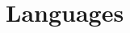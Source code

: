 \documentclass[11pt,a4paper,sans]{moderncv} %
\renewcommand*{\cventry}[7][.25em]{%
  \cvitem[#1]{#2}{%
    {\bfseries#3}%
   	\if\relax\detokenize{#4}\relax{}\else{, {\slshape#4}}\fi%
    \if\relax\detokenize{#5}\relax{}\else{ #5}\fi%
    \if\relax\detokenize{#6}\relax{}\else{ #6}\fi%
    \strut%
    \ifx&#7&%
      \else{\newline{}\begin{minipage}[t]{\linewidth}\small#7\end{minipage}}\fi}}
\renewcommand{\linkedin}{Linked\tikz[baseline=(i.text)]\node[fill=blue,rounded corners=0.25ex,text=white,inner sep=0.3ex](i) {in};}
\begin{document}

\section{Languages}

\cvitemwithcomment{\bfseries \native}{\mdseries \swedish}{}
\cvitemwithcomment{\bfseries \excellent}{\mdseries \finnish{} \english}{}
\cvitemwithcomment{\bfseries \basics}{\mdseries \japanese{} \german}{}


 
 
\end{document}
